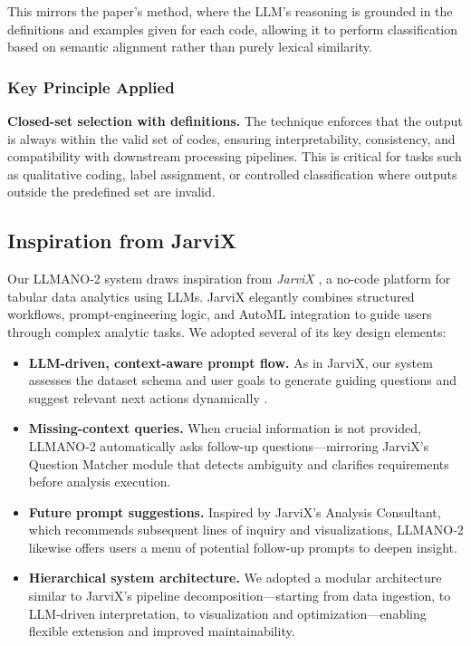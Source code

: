 \documentclass{article}
\begin{document}
This mirrors the paper's method, where the LLM’s reasoning is grounded in the definitions and examples given for each code, allowing it to perform classification based on semantic alignment rather than purely lexical similarity.

\subsubsection{Key Principle Applied}


\textbf{Closed-set selection with definitions.} The technique enforces that the output is always within the valid set of codes, ensuring interpretability, consistency, and compatibility with downstream processing pipelines. This is critical for tasks such as qualitative coding, label assignment, or controlled classification where outputs outside the predefined set are invalid.

\subsection{Inspiration from JarviX}

Our LLMANO‑2 system draws inspiration from \textit{JarviX} , a no-code platform for tabular data analytics using LLMs. JarviX elegantly combines structured workflows, prompt-engineering logic, and AutoML integration to guide users through complex analytic tasks. We adopted several of its key design elements:

\begin{itemize}
    \item \textbf{LLM-driven, context-aware prompt flow.} As in JarviX, our system assesses the dataset schema and user goals to generate guiding questions and suggest relevant next actions dynamically .

    \item \textbf{Missing-context queries.} When crucial information is not provided, LLMANO‑2 automatically asks follow-up questions—mirroring JarviX’s Question Matcher module that detects ambiguity and clarifies requirements before analysis execution.
    \item \textbf{Future prompt suggestions.} Inspired by JarviX’s Analysis Consultant, which recommends subsequent lines of inquiry and visualizations, LLMANO‑2 likewise offers users a menu of potential follow-up prompts to deepen insight.
    \item \textbf{Hierarchical system architecture.} We adopted a modular architecture similar to JarviX’s pipeline decomposition—starting from data ingestion, to LLM-driven interpretation, to visualization and optimization—enabling flexible extension and improved maintainability.
\end{itemize}
\end{document}
